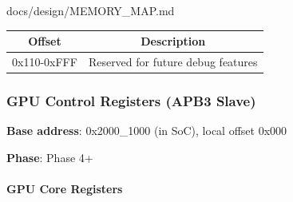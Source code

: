 \begin{relocated}{docs/design/MEMORY_MAP.md}
{
\begin{longtable}[]{@{}cc@{}}
\toprule\noalign{}
Offset & Description \\
\midrule\noalign{}
\endhead
\bottomrule\noalign{}
\endlastfoot
0x110-0xFFF & Reserved for future debug features \\
\end{longtable}
}

\subsubsection{GPU Control Registers (APB3 Slave)}\label{ds:mm:memory-map:gpu-control-registers-apb3-slave}

\textbf{Base address}: 0x2000\_\allowbreak{}1000 (in SoC), local offset
0x000

\textbf{Phase}: Phase 4+

\paragraph{GPU Core Registers}\label{ds:mm:memory-map:gpu-core-registers}

{\small\setlength{\tabcolsep}{4pt}

}
\end{relocated}
